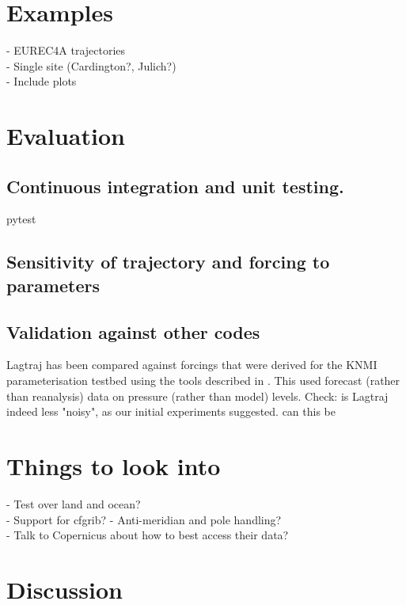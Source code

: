 \documentclass[a4paper,11pt]{article}
\begin{document}
\section{Examples}\label{sec:examples}

- EUREC4A trajectories \cite{bony2017} \\
- Single site (Cardington?, Julich?) \\
- Include plots

\section{Evaluation}\label{sec:evaluation}

\subsection{Continuous integration and unit testing.}

pytest \citep{okken2017}

\subsection{Sensitivity of trajectory and forcing to parameters}



\subsection{Validation against other codes}

Lagtraj has been compared against forcings that were derived for the KNMI parameterisation testbed using the tools described in .
This used forecast (rather than reanalysis) data on pressure (rather than model) levels.
Check: is Lagtraj indeed less "noisy", as our initial experiments suggested. can this be

\section*{Things to look into}

- Test over land and ocean? \\
- Support for cfgrib?
- Anti-meridian and pole handling? \\
- Talk to Copernicus about how to best access their data? \\

\section{Discussion}



\end{document}
